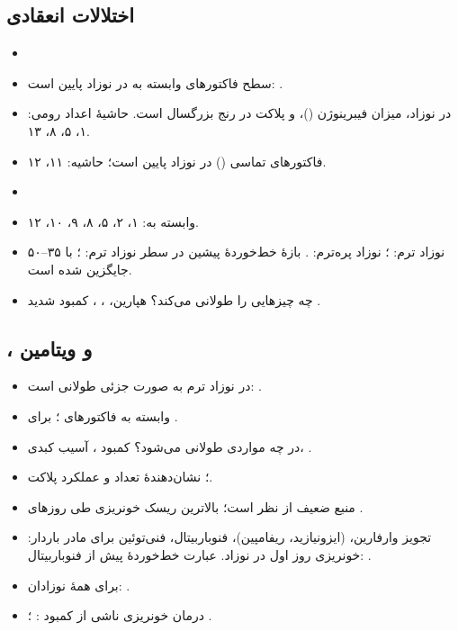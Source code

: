 \documentclass[12pt,a4paper]{article}
\begin{document}
\subsection*{اختلالات انعقادی}
\begin{itemize}
\item {}
\item سطح فاکتورهای وابسته به  در نوزاد پایین است: .
\item در نوزاد، میزان فیبرینوژن ()،  و پلاکت در رنج  بزرگسال است.
حاشیهٔ اعداد رومی: ۱، ۵، ۸، ۱۳.
\item فاکتورهای تماسی () در نوزاد پایین است؛ حاشیه: ۱۱، ۱۲.
\item {}
\item وابسته به: ۱، ۲، ۵، ۸، ۹، ۱۰، ۱۲.
\item {} نوزاد ترم: ؛ نوزاد پره‌ترم: .
بازهٔ خط‌خوردهٔ پیشین در سطر  نوزاد ترم:
؛ با ۳۵–۵۰ جایگزین شده است.
\item چه چیزهایی  را طولانی می‌کند؟ هپارین، ، ، کمبود شدید .
\end{itemize}

\subsection*{،  و ویتامین }
\begin{itemize}
\item {} در نوزاد ترم به صورت جزئی طولانی است: .
\item وابسته به فاکتورهای ؛ برای .
\item {} در چه مواردی طولانی می‌شود؟ کمبود ، آسیب کبدی، .
\item {}؛ نشان‌دهندهٔ تعداد و عملکرد پلاکت.
\item {} منبع ضعیف از نظر  است؛
بالاترین ریسک خونریزی طی روزهای .
\item تجویز وارفارین،  (ایزونیازید، ریفامپین)، فنوباربیتال، فنی‌توئین
برای مادر باردار: خونریزی روز اول در نوزاد.
عبارت خط‌خوردهٔ پیش از فنوباربیتال: .
\item برای همهٔ نوزادان: .
\item درمان خونریزی ناشی از کمبود : ؛ .
\end{itemize}
\end{document}
